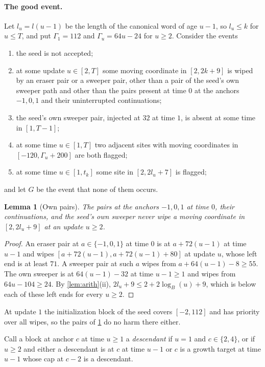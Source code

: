 \documentclass[11pt]{article}
\theoremstyle{plain}
\newtheorem{lemma}[theorem]{Lemma}
\theoremstyle{definition}
\theoremstyle{remark}
\begin{document}
\paragraph{The good event.} Let $l_u=l(u-1)$ be the length of the canonical word of age $u-1$, so $l_u\le k$ for $u\le T$, and put $\Gamma_1=112$ and $\Gamma_u=64u-24$ for $u\ge2$. Consider the events
\begin{enumerate}[label=(B\arabic*)]
\item\label{it:B1} the seed is not accepted;
\item\label{it:B2} at some update $u\in[2,T]$ some moving coordinate in $[2,2k+9]$ is wiped by an eraser pair or a sweeper pair, other than a pair of the seed's own sweeper path and other than the pairs present at time $0$ at the anchors $-1,0,1$ and their uninterrupted continuations;
\item\label{it:B3} the seed's own sweeper pair, injected at $32$ at time $1$, is absent at some time in $[1,T-1]$;
\item\label{it:B4} at some time $u\in[1,T]$ two adjacent sites with moving coordinates in $[-120,\Gamma_u+200]$ are both flagged;
\item\label{it:B5} at some time $u\in[1,t_k]$ some site in $[2,2l_u+7]$ is flagged;
\end{enumerate}
and let $G$ be the event that none of them occurs.

\begin{lemma}[Own pairs]\label{lem:own-pairs}
The pairs at the anchors $-1,0,1$ at time $0$, their continuations, and the seed's own sweeper never wipe a moving coordinate in $[2,2l_u+9]$ at an update $u\ge2$.
\end{lemma}

\begin{proof}
An eraser pair at $a\in\{-1,0,1\}$ at time $0$ is at $a+72(u-1)$ at time $u-1$ and wipes $[a+72(u-1),a+72(u-1)+80]$ at update $u$, whose left end is at least $71$. A sweeper pair at such $a$ wipes from $a+64(u-1)-8\ge55$. The own sweeper is at $64(u-1)-32$ at time $u-1\ge1$ and wipes from $64u-104\ge24$. By \cref{lem:arith}(ii), $2l_u+9\le2+2\log_B(u)+9$, which is below each of these left ends for every $u\ge2$.
\end{proof}

At update $1$ the initialization block of the seed covers $[-2,112]$ and has priority over all wipes, so the pairs of \cref{lem:own-pairs} do no harm there either.

Call a block at anchor $c$ at time $u\ge1$ a \emph{descendant} if $u=1$ and $c\in\{2,4\}$, or if $u\ge2$ and either a descendant is at $c$ at time $u-1$ or $c$ is a growth target at time $u-1$ whose cap at $c-2$ is a descendant.
\end{document}
